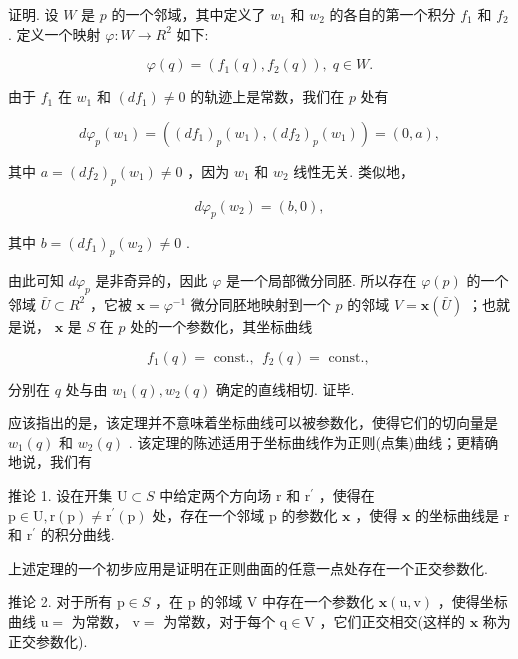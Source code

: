 证明. 设 \(W\) 是 \(p\) 的一个邻域，其中定义了 \({w}_{1}\) 和 \({w}_{2}\) 的各自的第一个积分 \({f}_{1}\) 和 \({f}_{2}\) . 定义一个映射 \(\varphi  : W \rightarrow  {R}^{2}\) 如下:

\[
\varphi \left( q\right)  = \left( {{f}_{1}\left( q\right) ,{f}_{2}\left( q\right) }\right) ,\;q \in  W.
\]

由于 \({f}_{1}\) 在 \({w}_{1}\) 和 \(\left( {d{f}_{1}}\right)  \neq  0\) 的轨迹上是常数，我们在 \(p\) 处有

\[
d{\varphi }_{p}\left( {w}_{1}\right)  = \left( {{\left( d{f}_{1}\right) }_{p}\left( {w}_{1}\right) ,{\left( d{f}_{2}\right) }_{p}\left( {w}_{1}\right) }\right)  = \left( {0,a}\right) ,
\]

其中 \(a = {\left( d{f}_{2}\right) }_{p}\left( {w}_{1}\right)  \neq  0\) ，因为 \({w}_{1}\) 和 \({w}_{2}\) 线性无关. 类似地，

\[
d{\varphi }_{p}\left( {w}_{2}\right)  = \left( {b,0}\right) ,
\]

其中 \(b = {\left( d{f}_{1}\right) }_{p}\left( {w}_{2}\right)  \neq  0\) .

由此可知 \(d{\varphi }_{p}\) 是非奇异的，因此 \(\varphi\) 是一个局部微分同胚. 所以存在 \(\varphi \left( p\right)\) 的一个邻域 \(\bar{U} \subset  {R}^{2}\) ，它被 \(\mathbf{x} = {\varphi }^{-1}\) 微分同胚地映射到一个 \(p\) 的邻域 \(V = \mathbf{x}\left( \bar{U}\right)\) ；也就是说， \(\mathbf{x}\) 是 \(S\) 在 \(p\) 处的一个参数化，其坐标曲线

\[
{f}_{1}\left( q\right)  = \text{ const., }\;{f}_{2}\left( q\right)  = \text{ const., }
\]

分别在 \(q\) 处与由 \({w}_{1}\left( q\right) ,{w}_{2}\left( q\right)\) 确定的直线相切. 证毕.

应该指出的是，该定理并不意味着坐标曲线可以被参数化，使得它们的切向量是 \({w}_{1}\left( q\right)\) 和 \({w}_{2}\left( q\right)\) . 该定理的陈述适用于坐标曲线作为正则(点集)曲线；更精确地说，我们有

推论 1. 设在开集 \(\mathrm{U} \subset  S\) 中给定两个方向场 \(\mathrm{r}\) 和 \({\mathrm{r}}^{\prime }\) ，使得在 \(\mathrm{p} \in  \mathrm{U},\mathrm{r}\left( \mathrm{p}\right)  \neq  {\mathrm{r}}^{\prime }\left( \mathrm{p}\right)\) 处，存在一个邻域 \(\mathrm{p}\) 的参数化 \(\mathbf{x}\) ，使得 \(\mathbf{x}\) 的坐标曲线是 \(\mathrm{r}\) 和 \({\mathrm{r}}^{\prime }\) 的积分曲线.

上述定理的一个初步应用是证明在正则曲面的任意一点处存在一个正交参数化.

推论 2. 对于所有 \(\mathrm{p} \in  S\) ，在 \(\mathrm{p}\) 的邻域 \(\mathrm{V}\) 中存在一个参数化 \(\mathbf{x}\left( {\mathrm{u},\mathrm{v}}\right)\) ，使得坐标曲线 \(\mathrm{u} =\) 为常数， \(\mathrm{v} =\) 为常数，对于每个 \(\mathrm{q} \in  \mathrm{V}\) ，它们正交相交(这样的 \(\mathbf{x}\) 称为正交参数化).

